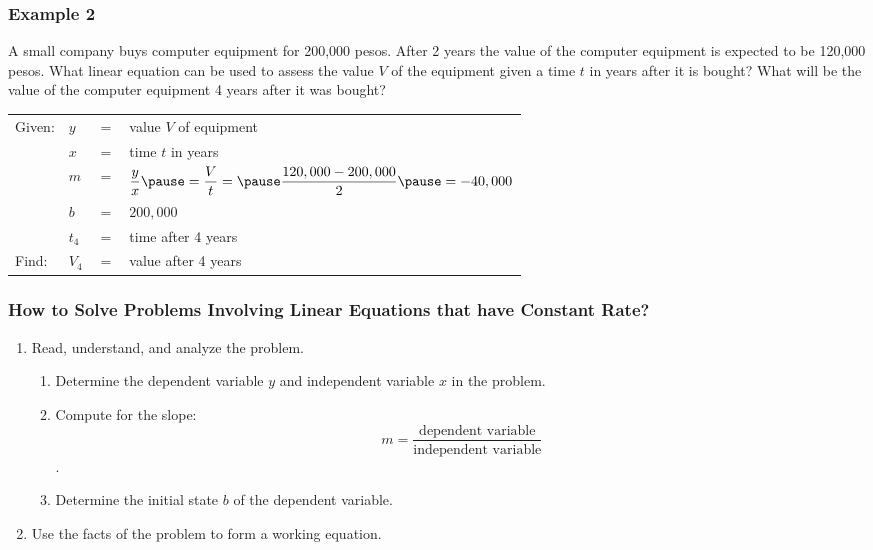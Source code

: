 \documentclass[14pt]{beamer}
\begin{document}
\begin{frame}
	\frametitle{Example 2}
	\footnotesize A small company buys computer equipment for 200,000 pesos. After 2 years	the value of the computer equipment is expected to be 120,000 pesos. What linear equation can be used to assess the value $ V $ of the equipment
	given a time $ t $ in years after it is bought? What will be the value of the computer equipment 4 years after it was bought?	
	
	\vone
	\normalsize
	\begin{tabular}{llll}
		Given: & \pause $ y $ & $ = $ & value $ V $ of equipment \\
		& \pause $ x $ & $ = $ & time $ t $ in years \\
		& \pause $ m $ & $ = $ &\footnotesize $ \dfrac{y}{x} \pause = \dfrac{V}{t} = \pause \dfrac{120,000 - 200,000}{2} \pause = -40,000$ \\
		& \pause $ b $ & $ = $ & $ 200,000 $ \\
		& \pause $ t_4 $ & $ = $ & time after 4 years \\
		\pause Find: & \pause $ V_4$ & $ = $ & value after 4 years \\
	\end{tabular}
\end{frame}

\begin{frame}
	\frametitle{How to Solve Problems Involving Linear Equations that have Constant Rate?}
	\footnotesize
	\begin{enumerate}  
		\item Read, understand, and analyze the problem. 
		\begin{enumerate}
			\footnotesize
			\item  Determine the dependent variable $ y $ and independent variable $ x $ in the problem.
			\item  Compute for the slope:  \[ m = \dfrac{\text{dependent variable}}{\text{independent variable}} \] .
			\item  Determine the initial state $ b $ of the dependent variable.
		\end{enumerate}
		\item  Use the facts of the problem to form a working equation.
	\end{enumerate}  
\end{frame}
\end{document}
